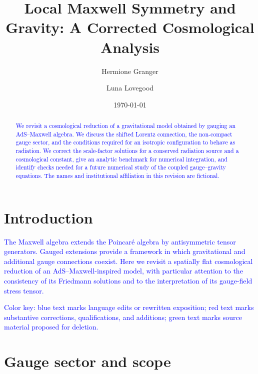 \documentclass[prd,reprint,eqsecnum,nofootinbib]{revtex4-1}
\newcommand{\lang}[1]{\textcolor{blue}{#1}}
\begin{document}
\title{Local Maxwell Symmetry and Gravity: A Corrected Cosmological Analysis}

\author{Hermione Granger}

\author{Luna Lovegood}

\date{\today}

\begin{abstract}
\lang{We revisit a cosmological reduction of a gravitational model obtained by gauging an AdS--Maxwell algebra. We discuss the shifted Lorentz connection, the non-compact gauge sector, and the conditions required for an isotropic configuration to behave as radiation. We correct the scale-factor solutions for a conserved radiation source and a cosmological constant, give an analytic benchmark for numerical integration, and identify checks needed for a future numerical study of the coupled gauge--gravity equations. The names and institutional affiliation in this revision are fictional.}
\end{abstract}

\maketitle

\section{Introduction}

\lang{The Maxwell algebra extends the Poincaré algebra by antisymmetric tensor generators. Gauged extensions provide a framework in which gravitational and additional gauge connections coexist. Here we revisit a spatially flat cosmological reduction of an AdS--Maxwell-inspired model, with particular attention to the consistency of its Friedmann solutions and to the interpretation of its gauge-field stress tensor.}

\lang{Color key: blue text marks language edits or rewritten exposition; red text marks substantive corrections, qualifications, and additions; green text marks source material proposed for deletion.}

\section{Gauge sector and scope}
\end{document}
